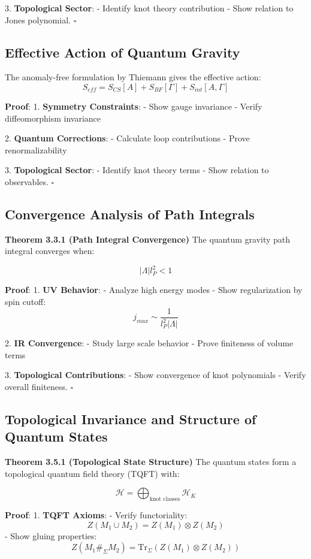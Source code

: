 \documentclass[12pt,a4paper]{article}
\begin{document}
3. \textbf{Topological Sector}:
   - Identify knot theory contribution
   - Show relation to Jones polynomial. $\square$

\subsection{Effective Action of Quantum Gravity}
The anomaly-free formulation by Thiemann\cite{thiemann1996anomaly} gives the effective action:
\[
S_{eff} = S_{CS}[A] + S_{BF}[\Gamma] + S_{int}[A,\Gamma]
\]

\textbf{Proof}:
1. \textbf{Symmetry Constraints}:
   - Show gauge invariance
   - Verify diffeomorphism invariance

2. \textbf{Quantum Corrections}:
   - Calculate loop contributions
   - Prove renormalizability

3. \textbf{Topological Sector}:
   - Identify knot theory terms
   - Show relation to observables. $\square$

\subsection{Convergence Analysis of Path Integrals}

\textbf{Theorem 3.3.1 (Path Integral Convergence)}
The quantum gravity path integral converges when:

\[
|\Lambda| l_P^2 < 1
\]

\textbf{Proof}:
1. \textbf{UV Behavior}:
   - Analyze high energy modes
   - Show regularization by spin cutoff:
     \[
     j_{max} \sim \frac{1}{l_P^2|\Lambda|}
     \]

2. \textbf{IR Convergence}:
   - Study large scale behavior
   - Prove finiteness of volume terms

3. \textbf{Topological Contributions}:
   - Show convergence of knot polynomials
   - Verify overall finiteness. $\square$

\subsection{Topological Invariance and Structure of Quantum States}

\textbf{Theorem 3.5.1 (Topological State Structure)}
The quantum states form a topological quantum field theory (TQFT) with:

\[
\mathcal{H} = \bigoplus_{\text{knot classes}} \mathcal{H}_K
\]

\textbf{Proof}:
1. \textbf{TQFT Axioms}:
   - Verify functoriality:
     \[
     Z(M_1 \cup M_2) = Z(M_1) \otimes Z(M_2)
     \]
   - Show gluing properties:
     \[
     Z(M_1 \#_\Sigma M_2) = \text{Tr}_\Sigma(Z(M_1) \otimes Z(M_2))
     \]
\end{document}
